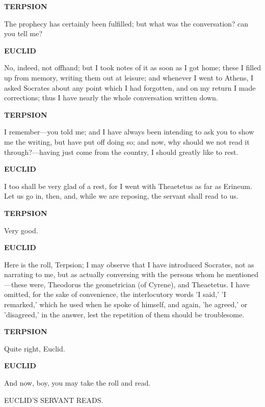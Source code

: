 \documentclass[11pt,letter]{article}
\begin{document}
\par \textbf{TERPSION}
\par   The prophecy has certainly been fulfilled; but what was the conversation? can you tell me?

\par \textbf{EUCLID}
\par   No, indeed, not offhand; but I took notes of it as soon as I got home; these I filled up from memory, writing them out at leisure; and whenever I went to Athens, I asked Socrates about any point which I had forgotten, and on my return I made corrections; thus I have nearly the whole conversation written down.

\par \textbf{TERPSION}
\par   I remember—you told me; and I have always been intending to ask you to show me the writing, but have put off doing so; and now, why should we not read it through?—having just come from the country, I should greatly like to rest.

\par \textbf{EUCLID}
\par   I too shall be very glad of a rest, for I went with Theaetetus as far as Erineum. Let us go in, then, and, while we are reposing, the servant shall read to us.

\par \textbf{TERPSION}
\par   Very good.

\par \textbf{EUCLID}
\par   Here is the roll, Terpsion; I may observe that I have introduced Socrates, not as narrating to me, but as actually conversing with the persons whom he mentioned—these were, Theodorus the geometrician (of Cyrene), and Theaetetus. I have omitted, for the sake of convenience, the interlocutory words 'I said,' 'I remarked,' which he used when he spoke of himself, and again, 'he agreed,' or 'disagreed,' in the answer, lest the repetition of them should be troublesome.

\par \textbf{TERPSION}
\par   Quite right, Euclid.

\par \textbf{EUCLID}
\par   And now, boy, you may take the roll and read.

\par  EUCLID'S SERVANT READS.
\end{document}
